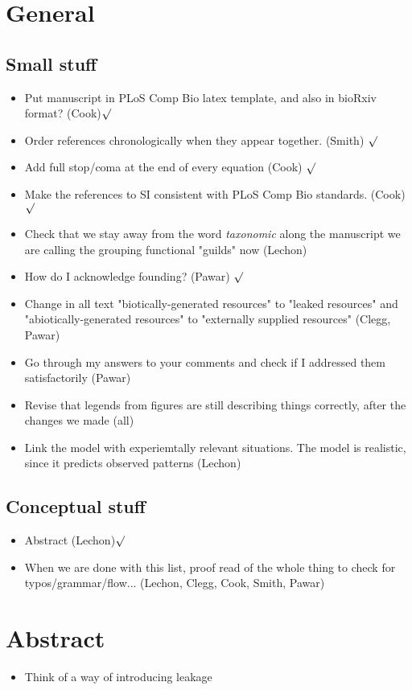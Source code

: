 \documentclass{article}
\begin{document}
    \section{General}
    \subsection{Small stuff}
    \begin{itemize}
        \item Put manuscript in PLoS Comp Bio latex template, and also in bioRxiv format? (Cook)$\surd$
        \item Order references chronologically when they appear together. (Smith) $\surd$
        \item Add full stop/coma at the end of every equation (Cook) $\surd$
        \item Make the references to SI consistent with PLoS Comp Bio standards. (Cook) $\surd$
        \item Check that we stay away from the word \textit{taxonomic} along the manuscript we are calling the grouping functional "guilds" now (Lechon)
        \item How do I acknowledge founding? (Pawar) $\surd$
        \item Change in all text "biotically-generated resources" to "leaked resources" and "abiotically-generated resources" to "externally supplied resources" (Clegg, Pawar)
        \item Go through my answers to your comments and check if I addressed them satisfactorily (Pawar)
        \item Revise that legends from figures are still describing things correctly, after the changes we made (all)
        \item Link the model with experiemtally relevant situations. The model is realistic, since it predicts observed patterns (Lechon)
    \end{itemize}
    \subsection{Conceptual stuff}
    \begin{itemize}
        \item Abstract (Lechon)$\surd$
        \item When we are done with this list, proof read of the whole thing to check for typos/grammar/flow... (Lechon, Clegg, Cook, Smith, Pawar)
    \end{itemize}
    \section{Abstract}
    \begin{itemize}
        \item Think of a way of introducing leakage
    \end{itemize}
\end{document}
